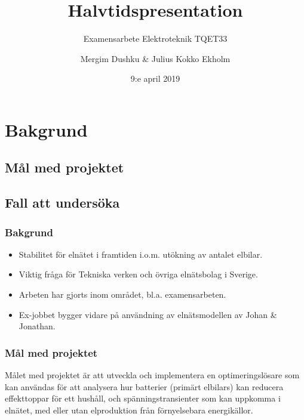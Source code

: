 \documentclass[noamsthm, swedish]{beamer}
\title[Halvtidspresentation]{Halvtidspresentation}
\subtitle{Examensarbete Elektroteknik TQET33}
\author{Mergim Dushku \& Julius Kokko Ekholm}
\institute{Fordonssystem\\ 
Institutionen för systemteknik\\ 
Linköpings universitet}
\date{9:e april 2019}
\begin{document}
\maketitle
\makeoutline

%
\section{Bakgrund}
\subsection{Mål med projektet}
\subsection{Fall att undersöka}
%

\begin{frame}
\frametitle{Bakgrund}
    \begin{itemize}
        \item Stabilitet för elnätet i framtiden i.o.m. utökning av antalet elbilar.
        
        \item Viktig fråga för Tekniska verken och övriga elnätsbolag i Sverige. 
        
        \item Arbeten har gjorts inom området, bl.a. examensarbeten.
        
        \item Ex-jobbet bygger vidare på användning av elnätsmodellen av Johan \& Jonathan.
    \end{itemize}
\end{frame}

\begin{frame}

\frametitle{Mål med projektet}

Målet med projektet är att utveckla och implementera en optimeringslösare som kan användas för att analysera hur batterier (primärt elbilars) kan reducera effekttoppar för ett hushåll, och spänningstransienter som kan uppkomma i elnätet, med eller utan elproduktion från förnyelsebara energikällor.

\end{frame}
\end{document}
